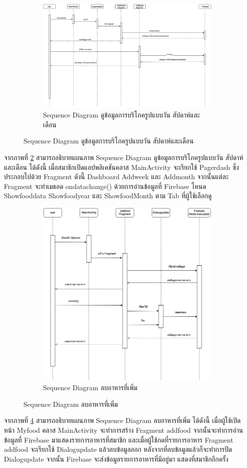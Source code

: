 	\begin{figure}
	\begin{figure}[H]
		\centering
		\includegraphics[width=1\columnwidth]
		{Figures/3/Sequence/sqtabnew.png}
		\caption{Sequence Diagram ดูข้อมูลการบริโภครูปแบบวัน สัปดาห์และเดือน}
		\label{Fig:Sequence-sqtab}
	\end{figure}
	\end{figure}
	\newpage
	จากภาพที่ \ref{Fig:Sequence-sqtab} สามารถอธิบายแผนภาพ Sequence Diagram ดูข้อมูลการบริโภครูปแบบวัน สัปดาห์และเดือน ได้ดังนี้ เมื่อสมาชิกเปิดแอปพลิเคชันคลาส MainActivity จะเรียกใช้ Pagerdash  
	ซึ่งประกอบไปด้วย Fragment ดังนี้  Dashboard Addweek และ Addmonth 	จากนั้นแต่ละ Fragment จะทำเมธอด ondatachange() 
	ด้วยการอ่านข้อมูลที่ Firebase โหนด Showfooddata Showfoodyear และ ShowfoodMonth ตาม Tab ที่ผู้ใช้เลือกดู

	\begin{figure}
	\begin{figure}[H]
		\centering
		\includegraphics[width=0.6\columnwidth]
		{Figures/3/Sequence/sqdelete.png}
		\caption{Sequence Diagram ลบอาหารที่เพิ่ม}
		\label{Fig:Sequence-delete}
	\end{figure}
	\end{figure}
	\newpage
	จากภาพที่ \ref{Fig:Sequence-delete} สามารถอธิบายแผนภาพ Sequence Diagram ลบอาหารที่เพิ่ม ได้ดังนี้ เมื่อผู้ใช้เปิดหน้า Myfood คลาส MainActivity จะทำการสร้าง Fragment addfood  จากนั้นจะทำการอ่านข้อมูลที่ Firebase มาแสดงรายการอาหารที่สมาชิก และเมื่อผู้ใช้กดที่รายการอาหาร  Fragment addfood  จะเรียกใช้ Dialogupdate แล้วลบข้อมูลออก หลังจากที่ลบข้อมูลแล้วก็จะทำการปิด Dialogupdate 
	จากนั้น Firebase จะส่งข้อมูลรายการอาหารที่มีอยู่มา แสดงที่สมาชิกอีกครั้ง
	\newpage	

